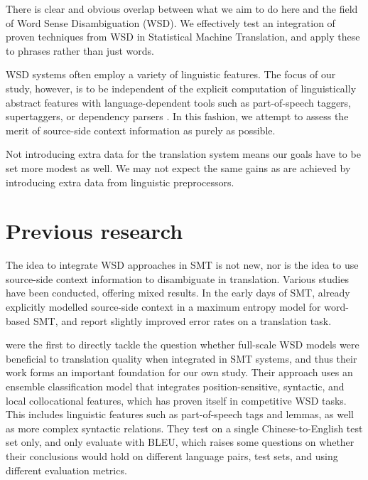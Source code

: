 \documentclass[smallextended]{svjour3}       %
\theoremstyle{break}
\begin{document}
There is clear and obvious overlap between what we aim to do here and the field of
Word Sense Disambiguation (WSD). We effectively test an integration of proven
techniques from WSD in Statistical Machine Translation, and apply these to
phrases rather than just words.

WSD systems often employ a variety of linguistic features. The focus of our
study, however, is to be independent of the explicit computation of
linguistically abstract features with language-dependent tools such as
part-of-speech taggers, supertaggers, or dependency parsers
\cite{Rejwanul+11}. 
In this fashion, we attempt to assess the merit of source-side
context information as purely as possible.

Not introducing extra data for the translation system means our goals have to
be set more modest as well. We may not expect the same gains as are achieved by
introducing extra data from linguistic preprocessors.

\section{Previous research}

The idea to integrate WSD approaches in SMT is not new, nor is the idea to use
source-side context information to disambiguate in translation. Various studies
have been conducted, offering mixed results. In the early days of SMT,
\cite{GarciaVarea+02} already explicitly modelled source-side context in a
maximum entropy model for word-based SMT, and report slightly improved error
rates on a translation task.

\cite{CarpuatWu05} were the first to directly tackle the question whether
full-scale WSD models were beneficial to translation quality when integrated in
SMT systems, and thus their work forms an important foundation for our own study.
Their approach uses an ensemble classification model that integrates
position-sensitive, syntactic, and local collocational features, which has
proven itself in competitive WSD tasks. This includes linguistic features such
as part-of-speech tags and lemmas, as well as more complex syntactic relations.
They test on a single Chinese-to-English test set only, and only
evaluate with BLEU,
which raises some questions on whether their conclusions would hold on
different language pairs, test sets, and using different evaluation metrics.
\end{document}
